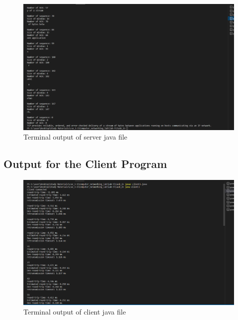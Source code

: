 \documentclass[11pt]{article}
\begin{document}
\begin{figure}[!h]
\centering
\includegraphics[width=\textwidth]{c_server2.png}
\caption{Terminal output of server java file }
\end{figure}
\FloatBarrier



\subsection{Output for the Client Program}

\begin{figure}[!h]
\centering
\includegraphics[width=\textwidth]{c_client1.png}
\caption{Terminal output of client java file }
\end{figure}
\FloatBarrier
\end{document}
